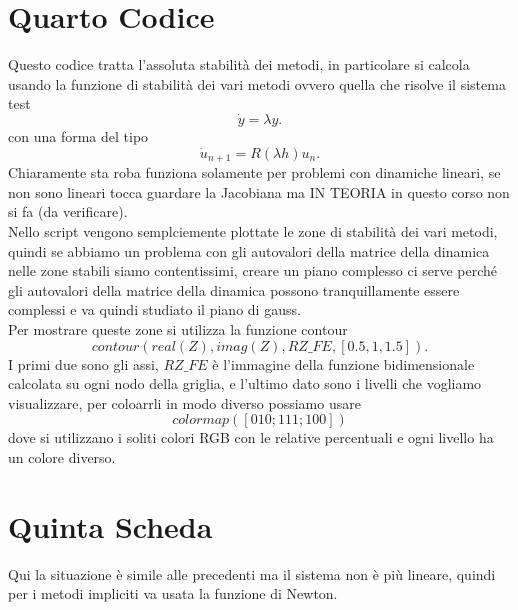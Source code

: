\documentclass[12px]{article}
\begin{document}
	\section{Quarto Codice}
	Questo codice tratta l'assoluta stabilità dei metodi, in particolare si calcola usando la funzione di stabilità dei vari metodi ovvero quella che risolve il sistema test
	\[
		\dot y = \lambda y
	.\] 
	con una forma del tipo
	\[
		\dot u_{n+1} = R(\lambda h)u_n
	.\] 
	Chiaramente sta roba funziona solamente per problemi con dinamiche lineari, se non sono lineari tocca guardare la Jacobiana ma IN TEORIA in questo corso non si fa (da verificare).\\
	Nello script vengono semplciemente plottate le zone di stabilità dei vari metodi, quindi se abbiamo un problema con gli autovalori della matrice della dinamica nelle zone stabili siamo contentissimi, creare un piano complesso ci serve perché gli autovalori della matrice della dinamica possono tranquillamente essere complessi e va quindi studiato il piano di gauss.\\
	Per mostrare queste zone si utilizza la funzione contour
	\[
		contour(real(Z), imag(Z), RZ\_FE,[0.5,1,1.5])
	.\] 
	I primi due sono gli assi, $RZ\_FE$ è l'immagine della funzione bidimensionale calcolata su ogni nodo della griglia, e l'ultimo dato sono i livelli che vogliamo visualizzare, per coloarrli in modo diverso possiamo usare
	\[
colormap([0 1 0; 1 1 1; 1 0 0])
\]
dove si utilizzano i soliti colori RGB con le relative percentuali e ogni livello ha un colore diverso.\\
\section{Quinta Scheda}
Qui la situazione è simile alle precedenti ma il sistema non è più lineare, quindi per i metodi impliciti va usata la funzione di Newton.
\end{document}
